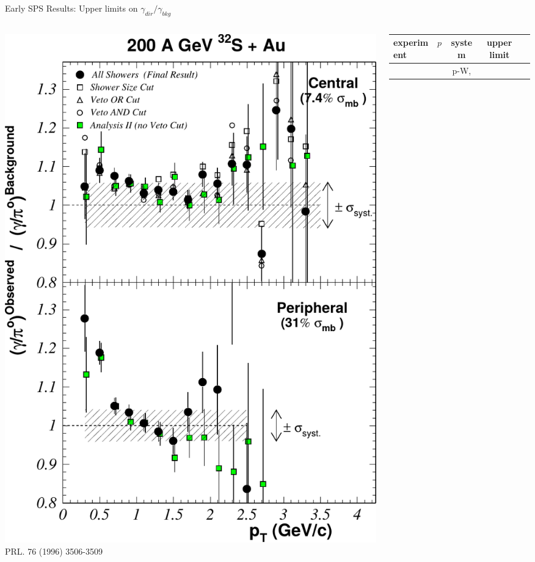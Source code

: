 \documentclass[aspectratio=169,10pt]{beamer}
\begin{document}
  
    \begin{frame}{Early SPS Results: Upper limits on $\gamma_{dir}/\gamma_{bkg}$}
    \begin{columns}
     \begin{column}{5.5cm}
        \includegraphics[width=\textwidth]{EMLectureWeek2018/UpperLimitsDirGammaWA80.pdf}\\\vspace{-0.2cm}
        \tiny PRL. 76 (1996) 3506-3509
     \end{column}
     \begin{column}{10cm}
     \footnotesize
      \begin{table}
       \begin{tabular}{lcccl}
        \toprule
        \setlength{\tabcolsep}{3pt}
        experiment & $p$ & system & upper limit \\ \midrule
                  &&p-W, \\

\end{tabular}
\end{table}
\end{column}
\end{columns}
\end{frame}
\end{document}
